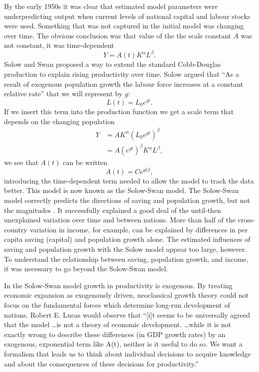 {By the early 1950s it was clear that estimated model parameters were underpredicting  output when  current levels of  national capital and labour stocks were used.   Something that was not captured in the initial model was changing over time. The obvious conclusion was that value of the the scale constant $A$  was not constant, it was time-dependent  
 \[Y=A(t)K^\alpha L^\beta.\]
Solow and Swan proposed a way to extend the standard \gls{Cobb-Douglas} production to explain rising productivity over time. 
Solow  argued that ``As a result of exogenous population growth the labour force increases at a constant relative rate'' that we will represent by  $g$:
  \[L(t)= L_0e^{gt}.\] 
If we insert this term into the production function we get a scale term that depends on the changing population 
\begin{eqnarray}
Y &= AK^\alpha (L_0e^{gt})^\beta\nonumber\\
  &= A(e^{gt})^{\beta}K^\alpha L^\beta,
\label{eqn-solow-swan3}
\end{eqnarray}
we see that $A(t)$ can be written
 \[A(t)=Ce^{gt\beta},\]
introducing the time-dependent term needed to allow the model to track the data better. This model is now known as the \gls{Solow-Swan model}. 
The \gls{Solow-Swan model} correctly predicts the directions of saving and population growth, but not the magnitudes \cite{mankiwContributionEmpiricsEconomic1992}. It successfully explained a good deal of the until-then unexplained variation over time and between nations. More than half  of the cross-country variation in income, for example,  can be explained by differences in per capita saving (capital) and population growth alone. The estimated influences of saving and population growth with the Solow model appear too large, however. To understand the relationship between saving, population growth, and income, it was necessary to go beyond the  Solow-Swan model.

In the Solow-Swan model growth in productivity is exogenous.
By treating economic expansion  as exogenously driven, neoclassical growth theory could not focus on the fundamental forces which determine long-run development of nations.   Robert E. Lucas \cite{lucasMechanicsEconomicDevelopment1988} would observe that ``[i]t seems to be universally agreed that the model \dots is not a theory of economic development.   \dots while it is not exactly wrong to describe these differences (in GDP  growth rates) by an exogenous, exponential term like A(t), neither is it useful to do so. We want a formalism that leads us to think about individual decisions to acquire knowledge and about the consequences of these decisions for productivity.'' 


}
